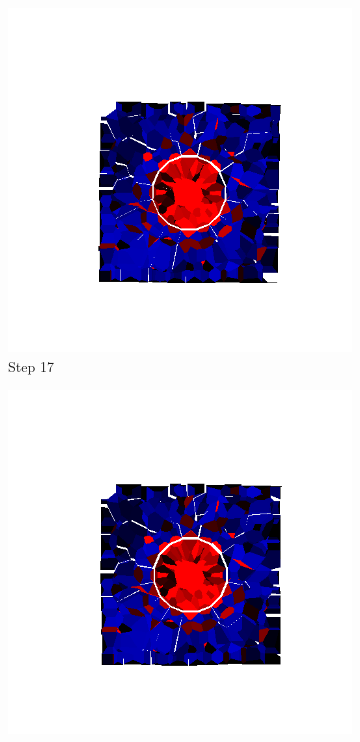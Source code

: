 \begin{figure}[ht!]
      \begin{subfigure}{.25\textwidth}
        \centering
        \includegraphics[width=1.0\linewidth]{Files/Small_ASR/IS/DEP5-STEP(017).png}
      \caption{Step 17}
      \end{subfigure}%
      \begin{subfigure}{.25\textwidth}
        \centering
        \includegraphics[width=1.0\linewidth]{Files/Small_ASR/IS/DEP5-STEP(018).png}

\end{subfigure}
\end{figure}
